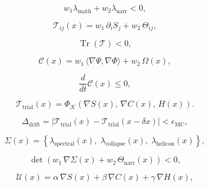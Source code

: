 \[
w_1 \lambda_{\text{math}} + w_2 \lambda_{\text{narr}} < 0,
\]

\[
\mathcal{T}_{ij}(x) = w_1\,\partial_i S_j + w_2\,\Theta_{ij},
\]

\[
\operatorname{Tr}(\mathcal{T}) < 0,
\]

\[
\mathcal{C}(x) = w_1\,\langle \nabla \Psi, \nabla \Phi \rangle 
               + w_2\,\Omega(x),
\]

\[
\frac{d}{dt}\mathcal{C}(x) \le 0,
\]

\[
\mathcal{T}_{\mathrm{trial}}(x) 
= \Phi_{\mathcal{K}}\!\left(
\nabla S(x),\,
\nabla C(x),\,
H(x)
\right).
\]

\[
\Delta_{\mathrm{drift}} = 
\left| \mathcal{T}_{\mathrm{trial}}(x) -
\mathcal{T}_{\mathrm{trial}}(x - \delta x) \right|
< \epsilon_{\mathrm{MC}},
\]

\[
\Sigma(x) = \left\{
\lambda_{\mathrm{spectral}}(x),\;
\lambda_{\mathrm{collapse}}(x),\;
\lambda_{\mathrm{helicon}}(x)
\right\},
\]

\[
\det\!\left(
w_1\,\nabla \Sigma(x)
+
w_2\,\Theta_{\mathrm{narr}}(x)
\right)
< 0,
\]

\[
\mathcal{U}(x) = 
\alpha\,\nabla S(x) +
\beta\, \nabla C(x) +
\gamma\, \nabla H(x),
\]

